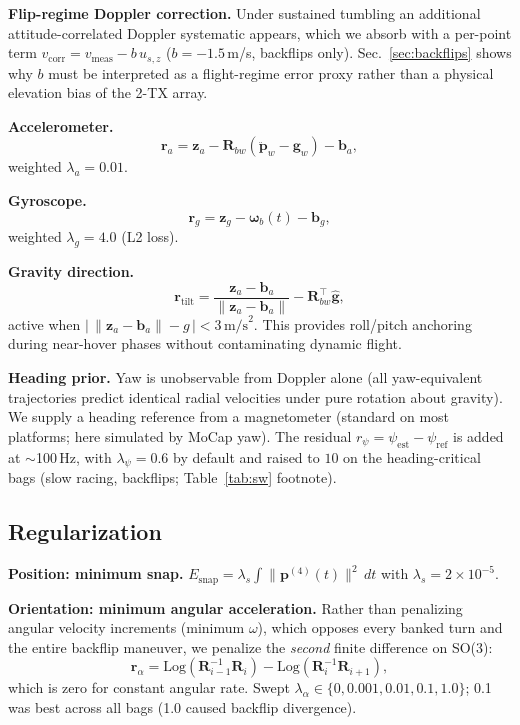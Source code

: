 \documentclass[journal]{IEEEtran}
\newcommand{\vR}{\mathbf{R}}
\newcommand{\vp}{\mathbf{p}}
\newcommand{\vom}{\boldsymbol{\omega}}
\newcommand{\vg}{\mathbf{g}}
\newcommand{\vb}{\mathbf{b}}
\newcommand{\vz}{\mathbf{z}}
\newcommand{\Log}{\mathrm{Log}}
\begin{document}
\textbf{Flip-regime Doppler correction.}
Under sustained tumbling an additional attitude-correlated Doppler
systematic appears, which we absorb with a per-point term
$v_{\mathrm{corr}} = v_{\mathrm{meas}} - b\,u_{s,z}$ ($b{=}{-}1.5$\,m/s,
backflips only).  Sec.~\ref{sec:backflips} shows why $b$ must be
interpreted as a flight-regime error proxy rather than a physical
elevation bias of the 2-TX array.

\textbf{Accelerometer.}
\begin{equation}
  \mathbf{r}_a = \vz_a - \vR_{bw}\!\left(\ddot{\vp}_w - \vg_w\right) - \vb_a,
  \label{eq:accel}
\end{equation}
weighted $\lambda_a = 0.01$.

\textbf{Gyroscope.}
\begin{equation}
  \mathbf{r}_g = \vz_g - \vom_b(t) - \vb_g,
  \label{eq:gyro}
\end{equation}
weighted $\lambda_g = 4.0$ (L2 loss).

\textbf{Gravity direction.}
\begin{equation}
  \mathbf{r}_{\mathrm{tilt}} =
    \frac{\vz_a - \vb_a}{\|\vz_a - \vb_a\|} - \vR_{bw}^{\top}\hat{\vg},
  \label{eq:tilt}
\end{equation}
active when $\bigl|\,\|\vz_a{-}\vb_a\| - g\,\bigr| < 3\,\mathrm{m/s}^2$.
This provides roll/pitch anchoring during near-hover phases without
contaminating dynamic flight.

\textbf{Heading prior.}
Yaw is unobservable from Doppler alone (all yaw-equivalent
trajectories predict identical radial velocities under pure
rotation about gravity).  We supply a heading reference from a magnetometer (standard on
most platforms; here simulated by MoCap yaw).  The residual $r_\psi = \psi_\text{est} - \psi_\text{ref}$
is added at $\sim$100\,Hz, with $\lambda_\psi = 0.6$ by default and
raised to $10$ on the heading-critical bags (slow racing, backflips;
Table~\ref{tab:sw} footnote).

\subsection{Regularization}
\label{sec:reg}

\textbf{Position: minimum snap.}
$E_{\text{snap}} = \lambda_s \int \|\vp^{(4)}(t)\|^2\,dt$
with $\lambda_s = 2{\times}10^{-5}$.

\textbf{Orientation: minimum angular acceleration.}
Rather than penalizing angular velocity increments (minimum $\omega$),
which opposes every banked turn and the entire backflip maneuver, we
penalize the \emph{second} finite difference on SO(3):
\begin{equation}
  \mathbf{r}_\alpha = \Log(\vR_{i-1}^{-1}\vR_i)
                    - \Log(\vR_i^{-1}\vR_{i+1}),
  \label{eq:min_alpha}
\end{equation}
which is zero for constant angular rate.
Swept $\lambda_\alpha \in \{0, 0.001, 0.01, 0.1, 1.0\}$; 0.1
was best across all bags (1.0 caused backflip divergence).
\end{document}

